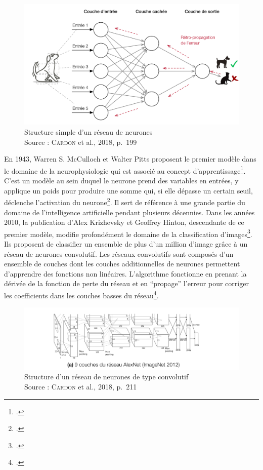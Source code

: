 \documentclass[a4paper, twoside, 12pt]{book}
\begin{document}
\begin{figure}[!h]
    \centering
    \includegraphics[width=12cm]{images/resSimple_CardonP199.png}
    \caption[Structure simple d'un réseau de neurones]{Structure simple d'un réseau de neurones \\ Source : C\textsc{ardon} et al., 2018, p.~199}
    \label{resSimple}
\end{figure}

En 1943, Warren S. McCulloch et Walter Pitts proposent le premier modèle dans le domaine de la neurophysiologie qui est associé au concept d'apprentissage\footcite{mccullochLogicalCalculusIdeas1943}. C'est un modèle au sein duquel \og le neurone prend des variables en entrées, y applique un poids pour produire une somme qui, si elle dépasse un certain seuil, déclenche l'activation du neurone\footcite{cardonRevancheNeuronesInvention2018}\fg. Il sert de référence à une grande partie du domaine de l'intelligence artificielle pendant plusieurs décennies. Dans les années 2010, la publication d'Alex Krizhevsky et Geoffrey Hinton, descendante de ce premier modèle, modifie profondément le domaine de la classification d'images\footcite{krizhevskyLearningMultipleLayers2009}. Ils proposent de classifier un ensemble de plus d'un million d'image grâce à un réseau de neurones \og convolutif\fg. Les réseaux convolutifs sont composés d'un ensemble de couches dont \og les couches additionnelles de neurones permettent d'apprendre des fonctions non linéaires. L'algorithme fonctionne en prenant la dérivée de la fonction de perte du réseau et en \textquotedblleft propage'' l'erreur pour corriger les coefficients dans les couches basses du réseau\footcite[p.~198]{cardonRevancheNeuronesInvention2018}.\fg

\begin{figure}[!h]
    \centering
    \includegraphics[width=15cm]{images/structureAlexNetCNN_CardonP211.png}
    \caption[Structure d'un réseau de neurones de type \og convolutif\fg]{Structure d'un réseau de neurones de type \og convolutif\fg \\ Source : C\textsc{ardon} et al., 2018, p.~211}
    \label{CNN} 
\end{figure}
\end{document}
